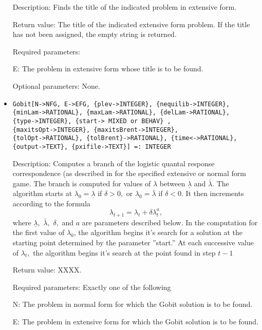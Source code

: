 \begin{itemize}
\bd
\item
[Description:] Finds the title of the indicated problem in extensive
form.
\item
[Return value:] The title of the indicated extensive form problem.  If
the title has not been assigned, the empty string is returned.
\item
[Required parameters:]\hfil\null

\bd
\item
[E:] The problem in extensive form whose title is to be found.
\ed

\item
[Optional parameters:] None.
\ed

\item
\protect \large \begin{verbatim}
Gobit[N->NFG, E->EFG, {plev->INTEGER}, {nequilib->INTEGER},
{minLam->RATIONAL}, {maxLam->RATIONAL}, {delLam->RATIONAL},
{type->INTEGER}, {start-> MIXED or BEHAV} ,
{maxitsOpt->INTEGER}, {maxitsBrent->INTEGER},
{tolOpt->RATIONAL}, {tolBrent}->RATIONAL}, {time<->RATIONAL},
{output->TEXT}, {pxifile->TEXT}] =: INTEGER
\end{verbatim}\normalsize

\bd
\item
[Description:] Computes a branch of the logistic quantal response
correspondence (as described in \cite[1995]{MckPal:1994} for 
the specified extensive or normal form game.  The branch is computed
for values of $\lambda$ between $\underline{\lambda}$ and
$\bar{\lambda}.$ The algorithm starts at $\lambda_0 =
\underline{\lambda}$ if $\delta>0,$ or $\lambda_0 = \bar{\lambda}$ 
if $\delta<0$. It then increments according to the formula 
$$
\lambda_{t+1} = \lambda_t +\delta \lambda_t^a,
$$ 
where $\underline\lambda,$ $\bar\lambda,$ $\delta,$ and $a$ are
parameters described below. In the computation for the first value of
$\lambda_0$, the algorithm begins it's search for a solution at the
starting point determined by the parameter ''start.''  At each
successive value of $\lambda_t,$ the algorithm begins it's search at
the point found in step $t - 1$
\item
[Return value:] XXXX.
\item 
[Required parameters:]\hfil\null Exactly one of the following

\bd
\item
[N:] The problem in normal form for which the Gobit solution is to be
found.
\item	
[E:] The problem in extensive form for which the Gobit solution is to
be found.
\ed


\end{itemize}
